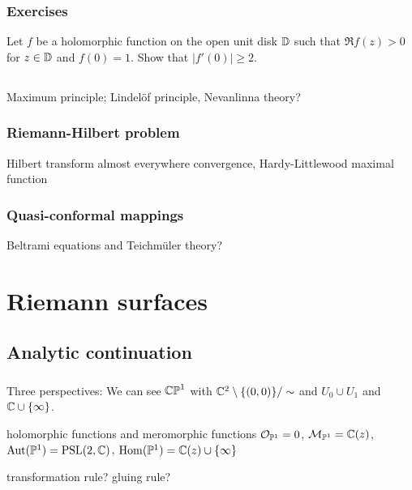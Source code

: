\documentclass{../../large}
\begin{document}
\section{Exercises}
\begin{prb}
Let $f$ be a holomorphic function on the open unit disk $\mathbb{D}$ such that $\Re f(z)>0$ for $z\in\mathbb{D}$ and $f(0)=1$. Show that $|f'(0)|\ge2$.
\end{prb}


\chapter{}

Maximum principle; Lindelöf principle,
Nevanlinna theory?

\section{Riemann-Hilbert problem}
Hilbert transform
almost everywhere convergence, Hardy-Littlewood maximal function

\section{Quasi-conformal mappings}
Beltrami equations and Teichm\"uler theory?











\part{Riemann surfaces}

\chapter{Analytic continuation}
\section{}
Three perspectives:
We can see $\mathbb{CP}^1$ with $\mathbb{C}^2\setminus\{(0,0)\}/\sim$ and $U_0\cup U_1$ and $\mathbb{C}\cup\{\infty\}$.

holomorphic functions and meromorphic functions $\mathcal{O}_{\mathbb{P}^1}=0$, $\mathcal{M}_{\mathbb{P}^1}=\mathbb{C}(z)$, $\operatorname{Aut}(\mathbb{P}^1)=\mathrm{PSL}(2,\mathbb{C})$, $\operatorname{Hom}(\mathbb{P}^1)=\mathbb{C}(z)\cup\{\infty\}$

transformation rule? gluing rule?
\end{document}
